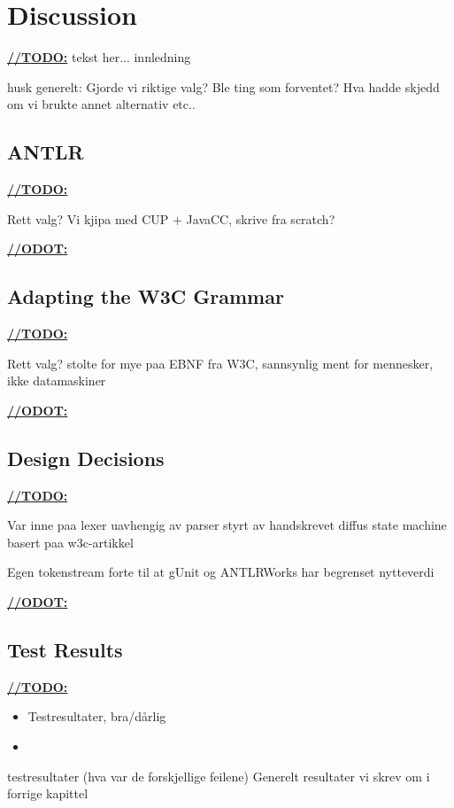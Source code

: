\chapter{Discussion}
\underline{\textbf{\LARGE //TODO:}} tekst her... innledning


husk generelt: Gjorde vi riktige valg? Ble ting som forventet? Hva hadde skjedd om vi brukte annet alternativ etc..

\section{ANTLR}
\underline{\textbf{\LARGE //TODO:}}

Rett valg?
Vi kjipa med CUP + JavaCC, skrive fra scratch?

\underline{\textbf{\LARGE //ODOT:}}

\section{Adapting the W3C Grammar}
\underline{\textbf{\LARGE //TODO:}}

Rett valg?
stolte for mye paa EBNF fra W3C, sannsynlig ment for mennesker, ikke datamaskiner

\underline{\textbf{\LARGE //ODOT:}}

\section{Design Decisions}

\underline{\textbf{\LARGE //TODO:}}

Var inne paa lexer uavhengig av parser styrt av handskrevet diffus state machine basert paa w3c-artikkel

Egen tokenstream forte til at gUnit og ANTLRWorks har begrenset nytteverdi

\underline{\textbf{\LARGE //ODOT:}}


\section{Test Results}

\underline{\textbf{\LARGE //TODO:}}
\begin{itemize}
\item Testresultater, bra/dårlig
\item
\end{itemize}

testresultater (hva var de forskjellige feilene)
Generelt resultater vi skrev om i forrige kapittel

